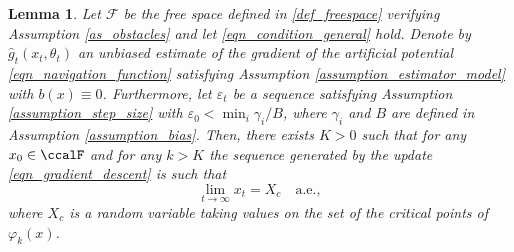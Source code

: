 \documentclass[article]{IEEEtran}
\newtheorem{lemma}{Lemma}
\theoremstyle{definition}
\begin{document}
%
\begin{lemma}\label{lemma_convergence_to_critical_points}
Let $\mathcal{F}$ be the free space defined in \eqref{def_freespace} verifying Assumption \ref{as_obstacles} and let \eqref{eqn_condition_general} hold. Denote by $\hat{g}_t(x_t,\theta_t)$ an unbiased estimate of the gradient of the artificial potential \eqref{eqn_navigation_function} satisfying Assumption \ref{assumption_estimator_model} with $b(x)\equiv 0$. Furthermore, let $\varepsilon_t$ be a sequence satisfying Assumption \ref{assumption_step_size} with $\varepsilon_0<\min_i\gamma_i/ B$, where $\gamma_i$ and $B$ are defined in Assumption \ref{assumption_bias}. Then, there exists $K>0$ such that for any $x_0\in \ccalF$ and for any $k>K$ the sequence generated by the update \eqref{eqn_gradient_descent} is such that
%
\begin{equation}
\lim_{t\to \infty} x_t = X_c \quad \mbox{a.e.},
\end{equation}
%
where $X_c$ is a random variable taking values on the set of the critical points of $\varphi_k(x)$. 
\end{lemma}
%
\end{document}
